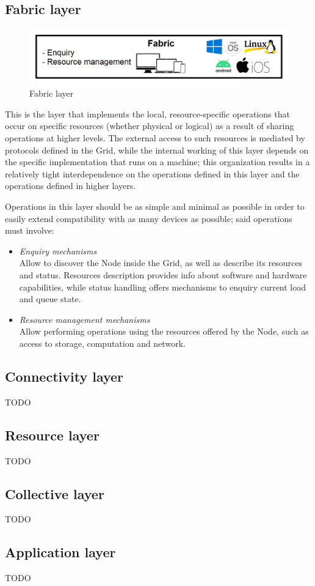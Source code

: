 \subsection{Fabric layer}
\begin{figure}[!ht]
    \centering
    \includegraphics[scale=0.3]{document/chapters/chapter_2/images/fabric_layer.png}
    \caption{Fabric layer}
    \label{fig:fabric_layer}
\end{figure}
This is the layer that implements the local, resource-specific operations that occur on specific resources (whether physical or logical) as a result of sharing operations at higher levels. The external access to such resources is mediated by protocols defined in the Grid, while the internal working of this layer depends on the specific implementation that runs on a machine; this organization results in a relatively tight interdependence on the operations defined in this layer and the operations defined in higher layers.
\vspace{40mm}

Operations in this layer should be as simple and minimal as possible in order to easily extend compatibility with as many devices as possible; said operations must involve:
\begin{itemize}
    \item \textit{Enquiry mechanisms}\\
    Allow to discover the Node inside the Grid, as well as describe its resources and status. Resources description provides info about software and hardware capabilities, while status handling offers mechanisms to enquiry current load and queue state.
    \item \textit{Resource management mechanisms}\\
    Allow performing operations using the resources offered by the Node, such as access to storage, computation and network.
\end{itemize} 

\subsection{Connectivity layer}
TODO

\subsection{Resource layer}
TODO

\subsection{Collective layer}
TODO

\subsection{Application layer}
TODO
